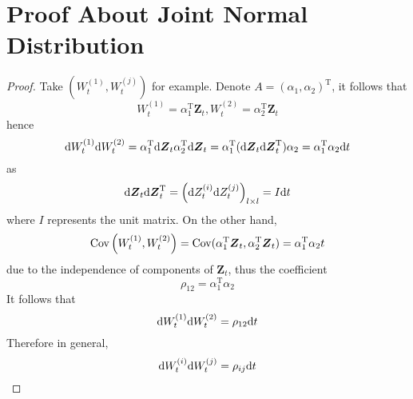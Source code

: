\documentclass{homework}
\newcommand{\trans}{\mathrm T}
\begin{document}
    \section{Proof About Joint Normal Distribution}
    \label{app:jn}
    \begin{proof}
        Take $(W_t^{(1)},W_t^{(j)})$ for example.
        Denote $A=(\alpha_1,\alpha_2)^\trans$,
        it follows that
        \[W_t^{(1)}=\alpha_1^\trans\boldsymbol Z_t,
        W_t^{(2)}=\alpha_2^\trans\boldsymbol Z_t\]
        hence
        \[\diff W_t^{(1)}\diff W_t^{(2)}
        =\alpha_1^\trans\diff\boldsymbol Z_t
        \alpha_2^\trans\diff\boldsymbol Z_t
        =\alpha_1^\trans(\diff\boldsymbol Z_t\diff\boldsymbol Z_t^\trans)\alpha_2
        =\alpha_1^\trans\alpha_2\diff t
        \]
        as
        \[\diff\boldsymbol Z_t\diff\boldsymbol Z_t^\trans
        =\left(\diff Z_t^{(i)}\diff Z_t^{(j)}\right)_{l\times l}=I\diff t\]
        where $I$ represents the unit matrix.
        On the other hand,
        \[\cov\left(W_t^{(1)},W_t^{(2)}\right)
        =\cov(\alpha_1^\trans\boldsymbol Z_t,\alpha_2^\trans\boldsymbol Z_t)
        =\alpha_1^\trans\alpha_2 t\]
        due to the independence of components of $\boldsymbol Z_t$,
        thus the coefficient
        \[\rho_{12}=\alpha_1^\trans\alpha_2\]
        It follows that
        \[\mathrm d W_t^{(1)}\mathrm d W_t^{(2)}=\rho_{12}\mathrm d t\]
        Therefore in general,
        \[\mathrm d W_t^{(i)}\mathrm d W_t^{(j)}=\rho_{ij}\mathrm d t\]
    \end{proof}
\end{document}
